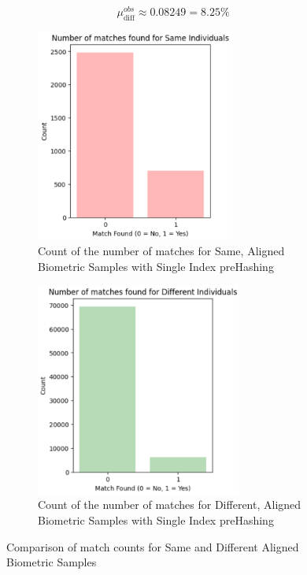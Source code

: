 \begin{enumerate}
\begin{itemize}
        \[ \mu_{\text{diff}}^{obs} \approx 0.08249 = 8.25\% \]
        \begin{figure}[H]
            \centering
            \begin{subfigure}[b]{0.48\linewidth}
                \centering
                \includegraphics[width=\linewidth,height=7cm,keepaspectratio]{latex-img/mu_same.png}
                \caption{Count of the number of matches for Same, Aligned Biometric Samples with Single Index preHashing}
                \label{mu_same}
            \end{subfigure}
            \hfill
            \begin{subfigure}[b]{0.48\linewidth}
                \centering
                \includegraphics[width=\linewidth,height=7cm,keepaspectratio]{latex-img/mu_diff.png}
                \caption{Count of the number of matches for Different, Aligned Biometric Samples with Single Index preHashing}
                \label{mu_diff}
            \end{subfigure}
            \caption{Comparison of match counts for Same and Different Aligned Biometric Samples}
        \end{figure}
    \end{itemize}
\end{enumerate}

